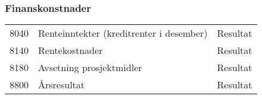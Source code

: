 \subsubsection*{Finanskonstnader}
\begin{table}[H]
	\begin{tabular}{l l l }
8040 & Renteinntekter (kreditrenter i desember) & Resultat\\
8140 & Rentekostnader & Resultat\\
8180 & Avsetning prosjektmidler & Resultat\\
8800 & Årsresultat & Resultat\\
\end{tabular}
\end{table}